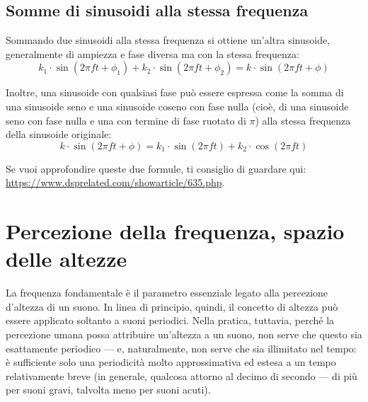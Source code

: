 \subsection{Somme di sinusoidi alla stessa frequenza}

Sommando due sinusoidi alla stessa frequenza si ottiene un'altra sinusoide, generalmente di ampiezza e fase diversa ma con la stessa frequenza:
\begin{equation}
k_1 \cdot \sin(2 \pi f t + \phi_1) +  k_2 \cdot \sin(2 \pi f t + \phi_2) = k \cdot \sin(2 \pi f t + \phi)
\end{equation}

Inoltre, una sinusoide con qualsiasi fase può essere espressa come la somma di una sinusoide seno e una sinusoide coseno con fase nulla (cioè, di una sinusoide seno con fase nulla e una con termine di fase ruotato di $\pi$) alla stessa frequenza della sinusoide originale:
\begin{equation}
k \cdot \sin(2 \pi f t + \phi) = k_1 \cdot \sin(2 \pi f t) + k_2 \cdot \cos(2 \pi f t)
\end{equation}

Se vuoi approfondire queste due formule, ti consiglio di guardare qui: \url{https://www.dsprelated.com/showarticle/635.php}.



\section{Percezione della frequenza, spazio delle altezze}

La frequenza fondamentale è il parametro essenziale legato alla percezione d'altezza di un suono. In linea di principio, quindi, il concetto di altezza può essere applicato soltanto a suoni periodici. Nella pratica, tuttavia, perché la percezione umana possa attribuire un'altezza a un suono, non serve che questo sia esattamente periodico --- e, naturalmente, non serve che sia illimitato nel tempo: è sufficiente solo una periodicità molto approssimativa ed estesa a un tempo relativamente breve (in generale, qualcosa attorno al decimo di secondo --- di più per suoni gravi, talvolta meno per suoni acuti).

